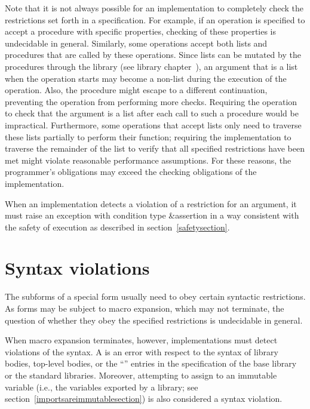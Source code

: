 Note that it is not always possible for an implementation to completely check
the restrictions set forth in a specification.  For example, if an
operation is specified to accept a procedure with specific properties,
checking of these properties is undecidable in general.  Similarly,
some operations accept both lists and procedures that are
called by these operations.  Since lists can be mutated by the procedures
through the  library (see library
chapter~), an argument that is a list
when the operation starts may become a non-list during the execution of the operation.
Also, the procedure might escape to a different continuation,
preventing the operation from performing more checks.
Requiring the operation to check that the argument is a list after
each call to such a procedure would be impractical.  Furthermore, some
operations that accept lists only need to traverse these lists
partially to perform their function; requiring the implementation to
traverse the remainder of the list to verify that all specified
restrictions have been met might
violate reasonable performance assumptions.  For these reasons, the
programmer's obligations may exceed the checking obligations of the
implementation.

When an implementation detects a violation of a restriction for an
argument, it must raise an exception with condition type
{\cf\&assertion} in a way consistent with the safety of execution as
described in section~\ref{safetysection}.

\section{Syntax violations}

The subforms of a special form usually need to obey certain syntactic
restrictions.  As forms may be subject to macro expansion, which may
not terminate, the question of whether they obey the specified
restrictions is undecidable in general.

When macro expansion terminates, however, implementations must detect
violations of the syntax.  A  is an error
with respect to the syntax of library bodies, top-level bodies,
or the ``\exprtype'' entries in the
specification of the base library or the standard libraries.
Moreover, attempting to assign to an immutable variable (i.e., the
variables exported by a library; see
section~\ref{importsareimmutablesection}) is also
considered a syntax violation.

